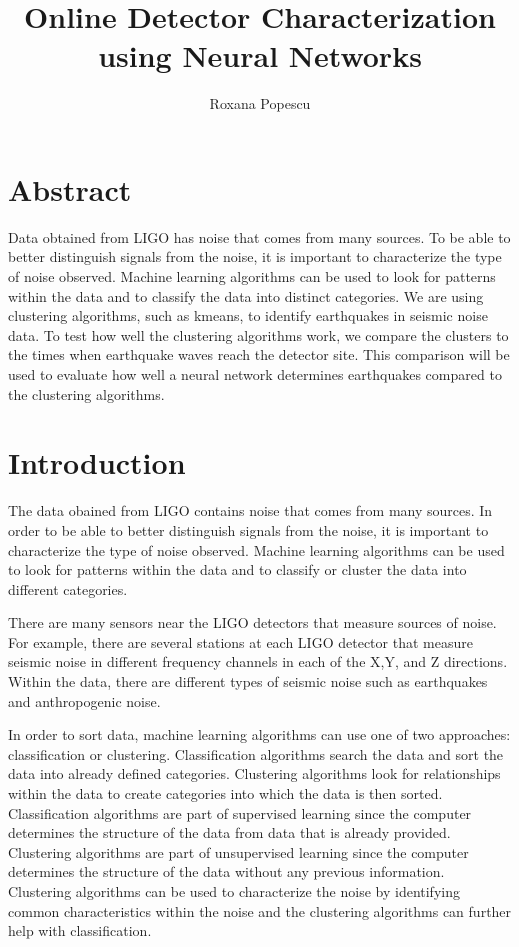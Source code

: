 \documentclass[colorlinks=true,pdfstartview=FitV,linkcolor=blue,
            citecolor=red,urlcolor=magenta]{ligodoc}
\title{Online Detector Characterization using Neural Networks}
\author{Roxana Popescu}
\begin{document}
\tableofcontents

\section{Abstract}

\indent

\par Data obtained from LIGO has noise that comes from many sources. To be able to better distinguish signals from the noise, it is important to characterize the type of noise observed. Machine learning algorithms can be used to look for patterns within the data and to classify the data into distinct categories. We are using clustering algorithms, such as kmeans, to identify earthquakes in seismic noise data. To test how well the clustering algorithms work, we compare the clusters to the times when earthquake waves reach the detector site. This comparison will be used to evaluate how well a neural network determines earthquakes compared to the clustering algorithms.

\section{Introduction} 

\indent

\par The data obained from LIGO contains noise that comes from many sources. In order to be able to better distinguish signals from the noise, it is important to characterize the type of noise observed. Machine learning algorithms can be used to look for patterns within the data and to classify or cluster the data into different categories.

\par There are many sensors near the LIGO detectors that measure sources of noise. For example, there are several stations at each LIGO detector that measure seismic noise in different frequency channels in each of the X,Y, and Z directions. Within the data, there are different types of seismic noise such as earthquakes and anthropogenic noise.  

\par In order to sort data, machine learning algorithms can use one of two approaches: classification or clustering. Classification algorithms search the data and sort the data into already defined categories. Clustering algorithms look for relationships within the data to create categories into which the data is then sorted. Classification algorithms are part of supervised learning since the computer determines the structure of the data from data that is already provided. Clustering algorithms are part of unsupervised learning since the computer determines the structure of the data without any previous information. Clustering algorithms can be used to characterize the noise by identifying common characteristics within the noise and the clustering algorithms can further help with classification. \cite{Citation1}
\end{document}
